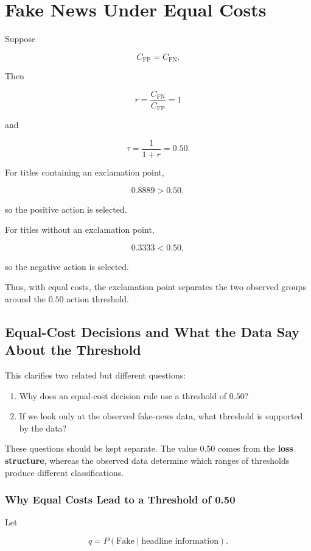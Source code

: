 \documentclass[11pt]{article}
\newcommand{\CFP}{C_{\mathrm{FP}}}
\newcommand{\CFN}{C_{\mathrm{FN}}}
\begin{document}
\section{Fake News Under Equal Costs}

Suppose

\[
\CFP=\CFN.
\]

Then

\[
r
=
\frac{\CFN}{\CFP}
=
1
\]

and

\[
\tau
=
\frac{1}{1+r}
=
0.50.
\]

For titles containing an exclamation point,

\[
0.8889>0.50,
\]

so the positive action is selected.

For titles without an exclamation point,

\[
0.3333<0.50,
\]

so the negative action is selected.

Thus, with equal costs, the exclamation point separates the two observed groups around the $0.50$ action threshold.

\subsection{Equal-Cost Decisions and What the Data Say About the Threshold}

This clarifies two related but different questions:

\begin{enumerate}
    \item Why does an equal-cost decision rule use a threshold of $0.50$?
    \item If we look only at the observed fake-news data, what threshold is supported by the data?
\end{enumerate}

These questions should be kept separate. The value $0.50$ comes from the
\textbf{loss structure}, whereas the observed data determine which ranges of
thresholds produce different classifications.

\subsubsection*{Why Equal Costs Lead to a Threshold of 0.50}

Let

\[
q = P(\text{Fake} \mid \text{headline information}).
\]
\end{document}
